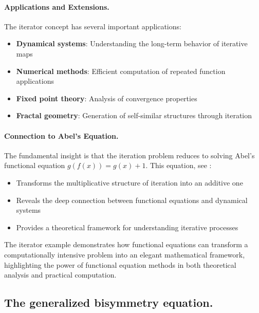 \vspace*{4mm}
\paragraph{Applications and Extensions.}
The iterator concept has several important applications:
\begin{itemize}
\item \textbf{Dynamical systems}: Understanding the long-term behavior of iterative maps
\item \textbf{Numerical methods}: Efficient computation of repeated function applications
\item \textbf{Fixed point theory}: Analysis of convergence properties
\item \textbf{Fractal geometry}: Generation of self-similar structures through iteration
\end{itemize}

\paragraph{Connection to Abel's Equation.}
The fundamental insight is that the iteration problem reduces to solving Abel's functional equation $g(f(x)) = g(x) + 1$. This equation, see \cite{Abe:26b}:
\begin{itemize}
\item Transforms the multiplicative structure of iteration into an additive one
\item Reveals the deep connection between functional equations and dynamical systems
\item Provides a theoretical framework for understanding iterative processes
\end{itemize}

The iterator example demonstrates how functional equations can transform a computationally intensive problem into an elegant mathematical framework, highlighting the power of functional equation methods in both theoretical analysis and practical computation.
\subsection{The generalized bisymmetry equation.}
